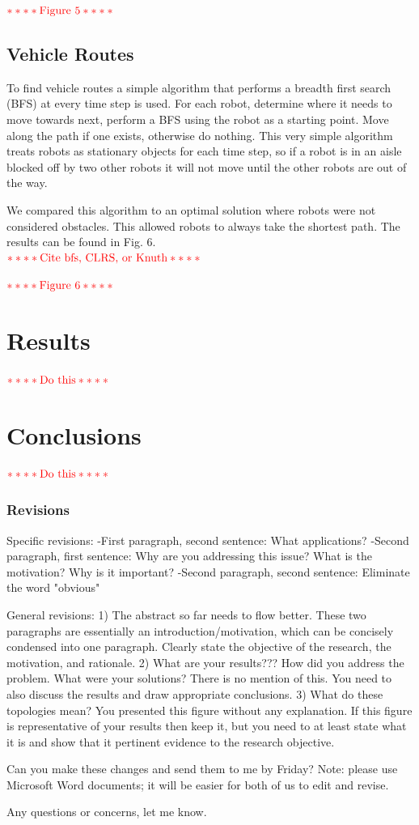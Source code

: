 \documentclass[11pt]{article}
\newcommand{\TODO}[1]{${\bf{\textcolor{red}{**** \text{#1} ****}}}$}
\begin{document}
\TODO{Figure 5}

\subsection{Vehicle Routes}

To find vehicle routes a simple algorithm that performs a breadth first search (BFS) at every time step is used. For each robot, determine where it needs to move towards next, perform a BFS using the robot as a starting point. Move along the path if one exists, otherwise do nothing. This very simple algorithm treats robots as stationary objects for each time step, so if a robot is in an aisle blocked off by two other robots it will not move until the other robots are out of the way.

We compared this algorithm to an optimal solution where robots were not considered obstacles. This allowed robots to always take the shortest path. The results can be found in Fig. 6.\\

\TODO{Cite bfs, CLRS, or Knuth}

\TODO{Figure 6}

\section{Results}

\TODO{Do this}

\section{Conclusions}

\TODO{Do this}

\nocite{*}



\vspace{.25in}
\subsubsection*{Revisions}
Specific revisions:
-First paragraph, second sentence: What applications?
-Second paragraph, first sentence: Why are you addressing this issue? What is the motivation? Why is it important? 
-Second paragraph, second sentence: Eliminate the word "obvious"

General revisions:
1) The abstract so far needs to flow better. These two paragraphs are essentially an introduction/motivation, which can be concisely condensed into one paragraph. Clearly state the objective of the research, the motivation, and rationale. 
2) What are your results??? How did you address the problem. What were your solutions? There is no mention of this. You need to also discuss the results and draw appropriate conclusions.
3) What do these topologies mean? You presented this figure without any explanation. If this figure is representative of your results then keep it, but you need to at least state what it is and show that it pertinent evidence to the research objective.

Can you make these changes and send them to me by Friday? Note: please use Microsoft Word documents; it will be easier for both of us to edit and revise. 

Any questions or concerns, let me know.

\end{document}
